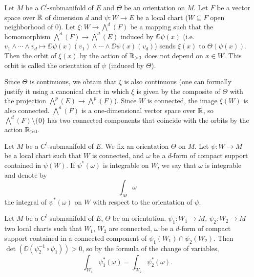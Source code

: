 \begin{propositionenv}\label{prop:7.6.6}
    Let $M$ be a $C^l$-submanifold of $E$ and $\Theta$ be an orientation on $M$.
    Let $F$ be a vector space over $\mathbb{R}$ of dimension $d$ and $\psi : W \longrightarrow E$ be a local chart ($W \subseteq F$ open neighborhood of $0$).
    Let $\xi : W \longrightarrow \bigwedge^d(F)$ be a mapping such that the homomorphism $\bigwedge^d(F) \longrightarrow \bigwedge^d(E)$ induced by $\DD \psi(x)$ (i.e. $v_1\wedge\cdots\wedge v_d \longmapsto \DD \psi(x)(v_1) \wedge \cdots \wedge \DD \psi(x)(v_d)$)
    sends $\xi(x)$ to $\Theta(\psi(x))$.
    Then the orbit of $\xi(x)$ by the action of $\mathbb{R}_{> 0}$ does not depend on $x \in W$.
    This orbit is called the orientation of $\psi$ (induced by $\Theta$).
\end{propositionenv}
\begin{proofenv}
    Since $\Theta$ is continuous, we obtain that $\xi$ is also continuous
    (one can formally justify it using a canonical chart in which $\xi$ is given by the composite of $\Theta$ with the projection $\bigwedge^p(E) \longrightarrow \bigwedge^p(F)$).
    Since $W$ is connected, the image $\xi(W)$ is also connected.
    $\bigwedge^d(F)$ is a one-dimensional vector space over $\mathbb{R}$, so $\bigwedge^d(F) \setminus \{0\}$ has two connected components that coincide with the orbits by the action $\mathbb{R}_{> 0}$.
\end{proofenv}

\begin{definitionenv}
    Let $M$ be a $C^l$-submanifold of $E$.
    We fix an orientation $\Theta$ on $M$.
    Let $\psi : W \longrightarrow M$ be a local chart such that $W$ is connected,
    and $\omega$ be a $d$-form of compact support contained in $\psi(W)$.
    If $\psi^*(\omega)$ is integrable on $W$, we say that $\omega$ is integrable and denote by
    $$\int_{M} \omega$$
    the integral of $\psi^*(\omega)$ on $W$ with respect to the orientation of $\psi$.
\end{definitionenv}

\begin{remark}
    Let $M$ be a $C^l$-submanifold of $E$, $\Theta$ be an orientation.
    $\psi_1: W_1 \longrightarrow M$, $\psi_2 : W_2 \longrightarrow M$ two local charts such that $W_1$, $W_2$ are connected,
    $\omega$ be a $d$-form of compact support contained in a connected component of $\psi_1(W_1)\cap \psi_2(W_2)$.
    Then $\det(\DD (\psi_2^{-1} \circ \psi_1)) > 0$, so by the formula of the change of variables,
    $$\int_{W_1} \psi_1^*(\omega) = \int_{W_2} \psi_2^*(\omega).$$
\end{remark}

